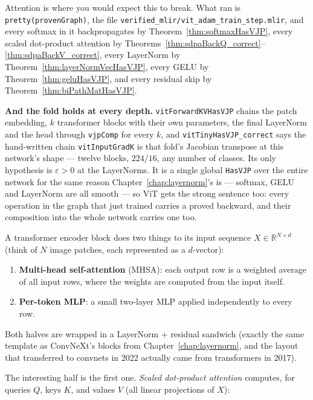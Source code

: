 Attention is where you would expect this to break. What ran is
\texttt{pretty(provenGraph)}, the file
\texttt{verified\_mlir/\allowbreak vit\_adam\_train\_step.mlir}, and every
softmax in it backpropagates by Theorem~\ref{thm:softmaxHasVJP}, every
scaled dot-product attention by
Theorems~\ref{thm:sdpaBackQ_correct}--\ref{thm:sdpaBackV_correct},
every LayerNorm by Theorem~\ref{thm:layerNormVecHasVJP}, every GELU by
Theorem~\ref{thm:geluHasVJP}, and every residual skip by
Theorem~\ref{thm:biPathMatHasVJP}.

\medskip\noindent\textbf{And the fold holds at every depth.}
\texttt{vitForwardKVHasVJP} chains the patch embedding, $k$
transformer blocks with their own parameters, the final LayerNorm and
the head through \texttt{vjpComp} for every $k$, and
\texttt{vitTinyHasVJP\_correct} says the hand-written chain
\texttt{vitInputGradK} is that fold's Jacobian transpose at this network's
shape --- twelve blocks, $224/16$, any number of classes. Its only hypothesis is $\varepsilon > 0$ at
the LayerNorms. It is a single global
\texttt{HasVJP} over the entire network for the same reason
Chapter~\ref{chap:layernorm}'s is --- softmax, GELU and LayerNorm are all
smooth --- so ViT gets the strong sentence too: every operation in the
graph that just trained carries a proved backward, and their
composition into the whole network carries one too.


A transformer encoder block does two things to its input sequence
\(X \in \mathbb{R}^{N \times d}\) (think of \(N\) image patches,
each represented as a \(d\)-vector):

\begin{enumerate}
\item \textbf{Multi-head self-attention} (MHSA): each output row
  is a weighted average of all input rows, where the weights
  are computed from the input itself.
\item \textbf{Per-token MLP}: a small two-layer MLP applied
  independently to every row.
\end{enumerate}

Both halves are wrapped in a LayerNorm + residual sandwich
(exactly the same template as ConvNeXt's blocks from
Chapter~\ref{chap:layernorm}, and the layout that transferred to
convnets in 2022 actually came from transformers in 2017).

The interesting half is the first one. \emph{Scaled dot-product
attention} computes, for queries \(Q\), keys \(K\), and values
\(V\) (all linear projections of \(X\)):

